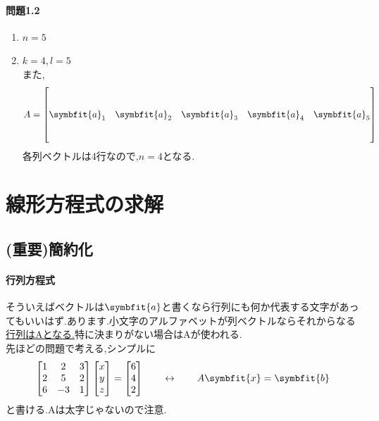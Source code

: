 \paragraph{問題1.2}
\begin{enumerate}[label=(\arabic*)]
    \item $n=5$
    \item $k=4,l=5$\\また,\[A = 
    \begin{bmatrix}
        &&&& \\
        &&&& \\
        \symbfit{a}_1&\symbfit{a}_2&\symbfit{a}_3&\symbfit{a}_4&\symbfit{a}_5 \\
        &&&& \\
        &&&& 
    \end{bmatrix}\]
    各列ベクトルは4行なので,$n=4$となる.
\end{enumerate}
\section{線形方程式の求解}
\subsection{(重要)簡約化}
\paragraph{行列方程式}
そういえばベクトルは$\symbfit{a}$と書くなら行列にも何か代表する文字があってもいいはず.あります.小文字のアルファベットが列ベクトルならそれからなる\underline{行列はAとなる.}特に決まりがない場合はAが使われる.\\
先ほどの問題で考える,シンプルに
\begin{equation}
\begin{bmatrix}
    1 & 2 & 3 \\
    2 & 5 & 2 \\
    6 & -3 & 1
\end{bmatrix}
\begin{bmatrix}
    x \\ y \\ z
\end{bmatrix}
=
\begin{bmatrix}
    6 \\ 4 \\ 2
\end{bmatrix}
\qquad \leftrightarrow \qquad A\symbfit{x} = \symbfit{b} \label{eq:Ax_b}
\end{equation}
と書ける.Aは太字じゃないので注意.

